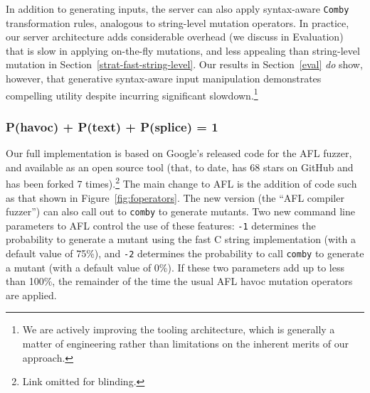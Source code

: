 In addition to generating inputs, the server can also apply syntax-aware
\texttt{Comby} transformation rules, analogous to string-level mutation
operators. In practice, our server architecture adds considerable overhead (we
discuss in Evaluation) that is slow in applying on-the-fly mutations, and less
appealing than string-level mutation in Section~\ref{strat-fast-string-level}. Our
results in Section~\ref{eval} \emph{do} show, however, that generative
syntax-aware input manipulation demonstrates compelling utility despite
incurring significant slowdown.\footnote{We are actively improving the tooling
architecture, which is generally a matter of engineering rather than
limitations on the inherent merits of our approach.}

\subsubsection{P(havoc) + P(text) + P(splice) = 1}

Our full implementation is based on Google's released code for the AFL
fuzzer, and available as an open source tool (that, to date, has 68
stars on GitHub and has been forked 7 times).\footnote{Link omitted for
  blinding.}  The main change to AFL is the addition of code such as that shown in
Figure~\ref{fig:foperators}.  The new version (the ``AFL compiler
fuzzer'') can also call out to {\tt comby} to generate mutants.  Two
new command line parameters to AFL control the use of these features:
{\tt -1} determines the probability to generate a mutant using the
fast C string implementation (with a default value of 75\%), and {\tt -2} determines the probability
to call {\tt comby} to generate a mutant (with a default value of
0\%).  If these two parameters add up to less than 100\%, the
remainder of the time the usual AFL havoc mutation operators are applied.
